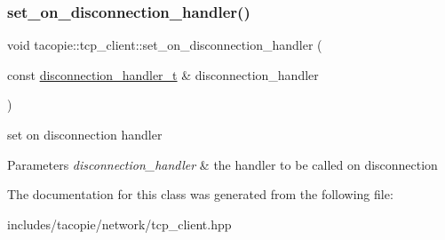\subsubsection{\texorpdfstring{set\+\_\+on\+\_\+disconnection\+\_\+handler()}{set\_on\_disconnection\_handler()}}
{\footnotesize\ttfamily void tacopie\+::tcp\+\_\+client\+::set\+\_\+on\+\_\+disconnection\+\_\+handler (\begin{DoxyParamCaption}\item[{const \hyperlink{classtacopie_1_1tcp__client_aca5df52e5ee6fa673cf212532ada1453}{disconnection\+\_\+handler\+\_\+t} \&}]{disconnection\+\_\+handler }\end{DoxyParamCaption})}

set on disconnection handler


\begin{DoxyParams}{Parameters}
{\em disconnection\+\_\+handler} & the handler to be called on disconnection \\
\hline
\end{DoxyParams}


The documentation for this class was generated from the following file\+:\begin{DoxyCompactItemize}
\item 
includes/tacopie/network/tcp\+\_\+client.\+hpp\end{DoxyCompactItemize}
